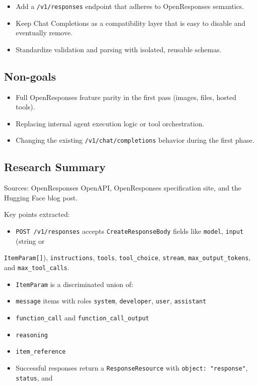 \begin{itemize}
  \item Add a \texttt{/v1/responses} endpoint that adheres to OpenResponses semantics.
  \item Keep Chat Completions as a compatibility layer that is easy to disable and eventually remove.
  \item Standardize validation and parsing with isolated, reusable schemas.
\end{itemize}


\subsection{Non-goals}


\begin{itemize}
  \item Full OpenResponses feature parity in the first pass (images, files, hosted tools).
  \item Replacing internal agent execution logic or tool orchestration.
  \item Changing the existing \texttt{/v1/chat/completions} behavior during the first phase.
\end{itemize}


\subsection{Research Summary}


Sources: OpenResponses OpenAPI, OpenResponses specification site, and the Hugging Face blog post.

Key points extracted:

\begin{itemize}
  \item \texttt{POST /v1/responses} accepts \texttt{CreateResponseBody} fields like \texttt{model}, \texttt{input} (string or
\end{itemize}

\texttt{ItemParam[]}), \texttt{instructions}, \texttt{tools}, \texttt{tool\_choice}, \texttt{stream}, \texttt{max\_output\_tokens}, and
\texttt{max\_tool\_calls}.
\begin{itemize}
  \item \texttt{ItemParam} is a discriminated union of:
  \item \texttt{message} items with roles \texttt{system}, \texttt{developer}, \texttt{user}, \texttt{assistant}
  \item \texttt{function\_call} and \texttt{function\_call\_output}
  \item \texttt{reasoning}
  \item \texttt{item\_reference}
  \item Successful responses return a \texttt{ResponseResource} with \texttt{object: "response"}, \texttt{status}, and
\end{itemize}


